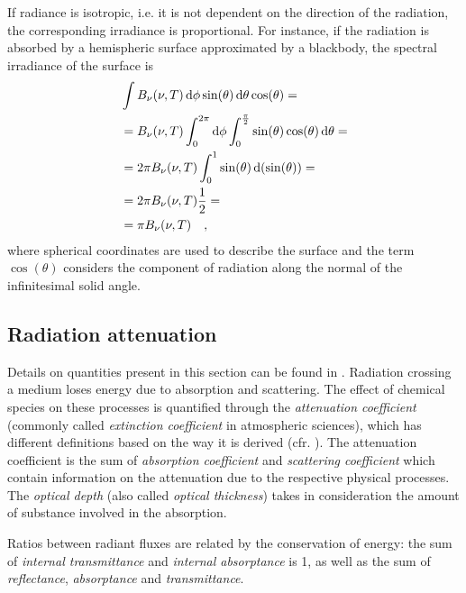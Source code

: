 \documentclass[a4paper,10pt,twocolumn,\classoptions]{article}
\begin{document}
If radiance is isotropic, i.e. it is not dependent on the direction of the radiation, the corresponding irradiance is proportional. For instance, if the radiation is absorbed by a hemispheric surface approximated by a blackbody, the spectral irradiance of the surface is
\begin{equation}
  \label{eq:spectral_irradiance_blackbody_hemisphere}
  \begin{split}
    & \int B_\nu (\nu, T) \odif{\phi} \sin(\theta) \odif{\theta} \cos(\theta) = \\
    & = B_\nu (\nu, T) \int_0^{2\pi} \odif{\phi} \int_0^\frac{\pi}{2} \sin(\theta) \cos(\theta) \odif{\theta} = \\
    & = 2 \pi B_\nu (\nu, T) \int_0^1 \sin(\theta) \odif{(\sin(\theta))} = \\
    & = 2 \pi B_\nu (\nu, T) \frac{1}{2} = \\
    & = \pi B_\nu (\nu, T)
    \quad ,
  \end{split}
\end{equation}
where spherical coordinates are used to describe the surface and the term $\cos(\theta)$ considers the component of radiation along the normal of the infinitesimal solid angle.



\subsection{Radiation attenuation}
\label{sec:Radiation attenuation}
Details on quantities present in this section can be found in \cite[285]{Modest}.
Radiation crossing a medium loses energy due to absorption and scattering. The effect of chemical species on these processes is quantified through the \emph{attenuation coefficient} (commonly called \emph{extinction coefficient} in atmospheric sciences), which has different definitions based on the way it is derived (cfr. \cite[44]{Catling}). The attenuation coefficient is the sum of \emph{absorption coefficient} and \emph{scattering coefficient} which contain information on the attenuation due to the respective physical processes. The \emph{optical depth} (also called \emph{optical thickness}) takes in consideration the amount of substance involved in the absorption.

Ratios between radiant fluxes are related by the conservation of energy: the sum of \emph{internal transmittance} and \emph{internal absorptance} is 1, as well as the sum of \emph{reflectance}, \emph{absorptance} and \emph{transmittance}.
\end{document}
